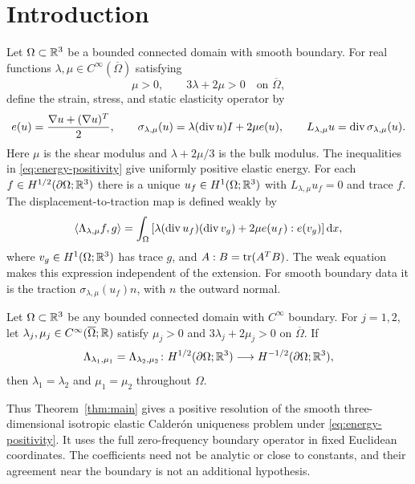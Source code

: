 \section{Introduction}\label{sec:introduction}

Let $\Omega\subset\mathbb R^3$ be a bounded connected domain with smooth boundary.
For real functions $\lambda,\mu\in C^\infty(\overline\Omega)$ satisfying
\begin{equation}\label{eq:energy-positivity}
  \mu>0,\qquad 3\lambda+2\mu>0
  \quad\text{on }\overline\Omega,
\end{equation}
define the strain, stress, and static elasticity operator by
\begin{equation}\label{eq:physical-operator}
 e(u)=\frac{\nabla u+(\nabla u)^T}{2},\qquad
 \sigma_{\lambda,\mu}(u)=\lambda(\operatorname{div} u)I+2\mu e(u),\qquad
 L_{\lambda,\mu}u=\operatorname{div}\sigma_{\lambda,\mu}(u).
\end{equation}
Here $\mu$ is the shear modulus and $\lambda+2\mu/3$ is the bulk modulus.
The inequalities in \eqref{eq:energy-positivity} give uniformly positive
elastic energy. For each $f\in H^{1/2}(\partial\Omega;\mathbb R^3)$ there is a
unique $u_f\in H^1(\Omega;\mathbb R^3)$ with $L_{\lambda,\mu}u_f=0$ and trace $f$.
The displacement-to-traction map is defined weakly by
\begin{equation}\label{eq:physical-dn}
 \langle\Lambda_{\lambda,\mu}f,g\rangle
 =\int_\Omega\left[
 \lambda(\operatorname{div} u_f)(\operatorname{div} v_g)+2\mu e(u_f):e(v_g)
 \right]\mathrm d x,
\end{equation}
where $v_g\in H^1(\Omega;\mathbb R^3)$ has trace $g$, and $A:B=\operatorname{tr}(A^TB)$.
The weak equation makes this expression independent of the extension.
For smooth boundary data it is the traction
$\sigma_{\lambda,\mu}(u_f)n$, with $n$ the outward normal.

\begin{theorem}\label{thm:main}
Let $\Omega\subset\mathbb R^3$ be any bounded connected domain with
$C^\infty$ boundary. For $j=1,2$, let
$\lambda_j,\mu_j\in C^\infty(\overline\Omega;\mathbb R)$ satisfy
$\mu_j>0$ and $3\lambda_j+2\mu_j>0$ on $\overline\Omega$.
If
\[
 \Lambda_{\lambda_1,\mu_1}
 =\Lambda_{\lambda_2,\mu_2}
 \colon H^{1/2}(\partial\Omega;\mathbb R^3)
       \longrightarrow H^{-1/2}(\partial\Omega;\mathbb R^3),
\]
then $\lambda_1=\lambda_2$ and $\mu_1=\mu_2$ throughout $\Omega$.
\end{theorem}

Thus Theorem~\ref{thm:main} gives a positive resolution of the smooth
three-dimensional isotropic elastic Calder\'on uniqueness problem under
\eqref{eq:energy-positivity}. It uses the full zero-frequency boundary
operator in fixed Euclidean coordinates. The coefficients need not be
analytic or close to constants, and their agreement near the boundary is
not an additional hypothesis.

